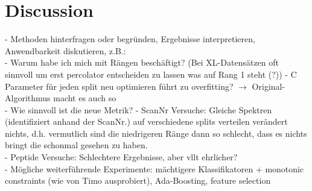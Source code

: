 \documentclass[10pt,a4paper]{article}
\begin{document}
	\section{Discussion}
		- Methoden hinterfragen oder begründen, Ergebnisse interpretieren, Anwendbarkeit diskutieren, z.B.:\\
		- Warum habe ich mich mit Rängen beschäftigt? (Bei XL-Datensätzen oft sinnvoll um erst percolator entscheiden zu lassen was auf Rang 1 steht (?))
		- C Parameter für jeden split neu optimieren führt zu overfitting? $\rightarrow$ Original-Algorithmus macht es auch so\\
		- Wie sinnvoll ist die neue Metrik?
		- ScanNr Versuche: Gleiche Spektren (identifiziert anhand der ScanNr.) auf verschiedene splits verteilen verändert nichts, d.h. vermutlich sind die niedrigeren Ränge dann so schlecht, dass es nichts bringt die schonmal gesehen zu haben.\\
		- Peptide Versuche: Schlechtere Ergebnisse, aber vllt ehrlicher?\\
		- Mögliche weiterführende Experimente: mächtigere Klassifikatoren + monotonic constraints (wie von Timo ausprobiert), Ada-Boosting, feature selection
		
		
		
		
\end{document}
